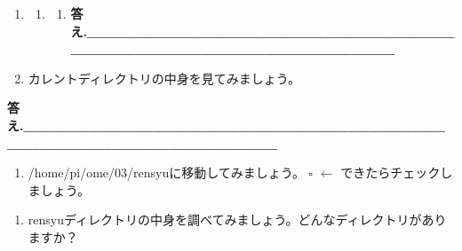 \documentclass[a4paper,dvipdfmx]{jarticle}
\newcounter{saveenum}
\begin{document}
\setcounter{saveenum}{\value{enumi}}
\begin{enumerate}
\setcounter{enumi}{\value{saveenum}}
\item \setcounter{saveenum}{\value{enumii}}
\begin{enumerate}
\setcounter{enumii}{\value{saveenum}}
\item \setcounter{saveenum}{\value{enumiii}}
\begin{enumerate}
\setcounter{enumiii}{\value{saveenum}}
\item[] {\ttfamily\bfseries
答え.\_\_\_\_\_\_\_\_\_\_\_\_\_\_\_\_\_\_\_\_\_\_\_\_\_\_\_\_\_\_\_\_\_\_\_\_\_\_\_\_\_\_\_\_\_\_\_\_\_\_\_\_\_\_\_\_\_\_\_\_\_\_\_\_}
\end{enumerate}
\end{enumerate}

\bigskip
\item
カレントディレクトリの中身を見てみましょう。


\bigskip
\end{enumerate}

\bigskip

{\ttfamily\bfseries
答え.\_\_\_\_\_\_\_\_\_\_\_\_\_\_\_\_\_\_\_\_\_\_\_\_\_\_\_\_\_\_\_\_\_\_\_\_\_\_\_\_\_\_\_\_\_\_\_\_\_\_\_\_\_\_\_\_\_\_\_\_\_\_\_\_}


\bigskip

\setcounter{saveenum}{\value{enumi}}
\begin{enumerate}
\setcounter{enumi}{\value{saveenum}}
\item /home/pi/ome/03/rensyuに移動してみましょう。\newline
${\square}$ $\leftarrow $
できたらチェックしましょう。
\end{enumerate}

\bigskip

\setcounter{saveenum}{\value{enumi}}
\begin{enumerate}
\setcounter{enumi}{\value{saveenum}}
\item \clearpage
rensyuディレクトリの中身を調べてみましょう。どんなディレクトリがありますか？
\end{enumerate}

\bigskip
\end{document}
